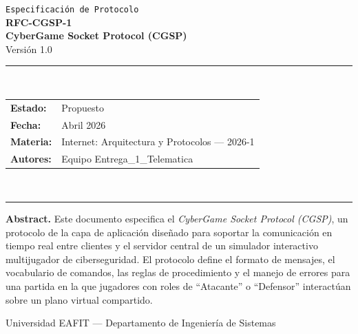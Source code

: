\documentclass[12pt, letterpaper]{article}
\begin{document}
\begin{titlepage}
    \centering
    \vspace*{1cm}

    {\small\texttt{Especificación de Protocolo}}\\[0.3cm]
    {\Huge\bfseries\color{cgsp-blue} RFC-CGSP-1}\\[0.5cm]
    {\large\bfseries CyberGame Socket Protocol (CGSP)}\\[0.2cm]
    {\large Versión 1.0}

    \vspace{1.5cm}
    \rule{\textwidth}{1pt}\\[0.4cm]
    {\normalsize
        \begin{tabular}{ll}
            \textbf{Estado:}   & Propuesto \\[4pt]
            \textbf{Fecha:}    & Abril 2026 \\[4pt]
            \textbf{Materia:}  & Internet: Arquitectura y Protocolos --- 2026-1 \\[4pt]
            \textbf{Autores:}  & Equipo Entrega\_1\_Telematica
        \end{tabular}
    }\\[0.4cm]
    \rule{\textwidth}{1pt}

    \vspace{1.5cm}
    \begin{mdframed}[backgroundcolor=cgsp-gray, linecolor=cgsp-blue, linewidth=1pt]
        \textbf{Abstract.} Este documento especifica el \textit{CyberGame Socket Protocol
        (CGSP)}, un protocolo de la capa de aplicación diseñado para soportar la
        comunicación en tiempo real entre clientes y el servidor central de un simulador
        interactivo multijugador de ciberseguridad. El protocolo define el formato de
        mensajes, el vocabulario de comandos, las reglas de procedimiento y el manejo de
        errores para una partida en la que jugadores con roles de ``Atacante'' o
        ``Defensor'' interactúan sobre un plano virtual compartido.
    \end{mdframed}

    \vfill
    {\small Universidad EAFIT --- Departamento de Ingeniería de Sistemas}
\end{titlepage}

\tableofcontents
\newpage

\end{document}
